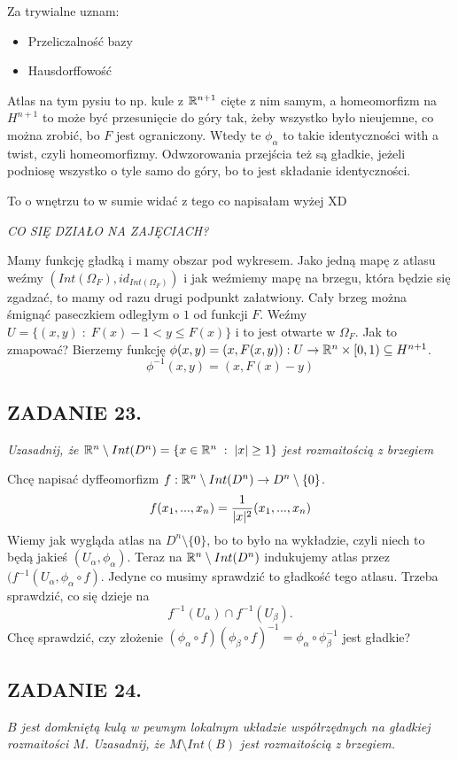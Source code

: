 Za trywialne uznam:
\begin{itemize}
    \item Przeliczalność bazy
    \item Hausdorffowość
\end{itemize}
Atlas na tym pysiu to np. kule z $\mathbb{R}^{n+1}$ cięte z nim samym, a homeomorfizm na $H^{n+1}$ to może być przesunięcie do góry tak, żeby wszystko było nieujemne, co można zrobić, bo $F$ jest ograniczony. Wtedy te $\phi_{\alpha}$ to takie identyczności with a twist, czyli homeomorfizmy. Odwzorowania przejścia też są gładkie, jeżeli podniosę wszystko o tyle samo do góry, bo to jest składanie identyczności.

To o wnętrzu to w sumie widać z tego co napisałam wyżej XD

\emph{CO SIĘ DZIAŁO NA ZAJĘCIACH?}

Mamy funkcję gładką i mamy obszar pod wykresem. Jako jedną mapę z atlasu weźmy
$(Int(\Omega_F),id_{Int(\Omega_F)})$ i jak weźmiemy mapę na brzegu, która będzie się
zgadzać, to mamy od razu drugi podpunkt załatwiony. Cały brzeg można śmignąć paseczkiem
odległym o $1$ od funkcji $F$. Weźmy $U=\{(x,y)\;:\;F(x)-1<y\leq F(x)\}$ i to jest otwarte
w $\Omega_F$. Jak to zmapować? Bierzemy funkcję
$\phi(x,y)=(x,F(x,y)):U\to\mathbb{R}^n\times[0,1)\subseteq H^{n+1}$.
$$\phi^{-1}(x,y)=(x,F(x)-y)$$


\subsection*{ZADANIE 23.}
\emph{\color{pink}Uzasadnij, że $\mathbb{R}^n\setminus Int(D^n)=\{x\in\mathbb{R}^n\;:\;|x|\geq1\}$ jest
rozmaitością z brzegiem}

Chcę napisać dyffeomorfizm $f:\mathbb{R}^n\setminus Int(D^n)\to D^n\setminus\{0\}$.
$$f(x_1,...,x_n)={1\over|x|^2}(x_1,...,x_n)$$
Wiemy jak wygląda atlas na $D^n\setminus\{0\}$, bo to było na wykładzie, czyli niech to
będą jakieś $(U_\alpha,\phi_\alpha)$. Teraz na $\mathbb{R}^n\setminus Int(D^n)$ indukujemy atlas
przez $(f^{-1}(U_\alpha,\phi_\alpha\circ f)$. Jedyne co musimy sprawdzić to gładkość tego
atlasu. Trzeba sprawdzić, co się dzieje na
$$f^{-1}(U_\alpha)\cap f^{-1}(U_\beta).$$
Chcę sprawdzić, czy złożenie $(\phi_\alpha\circ f)(\phi_\beta\circ
f)^{-1}=\phi_\alpha\circ\phi_\beta^{-1}$ jest gładkie?

\subsection*{ZADANIE 24.}
\emph{\color{yellow}$B$ jest domkniętą kulą w pewnym lokalnym układzie współrzędnych na
gładkiej rozmaitości $M$. Uzasadnij, że $M\setminus Int(B)$ jest rozmaitością z brzegiem.}

